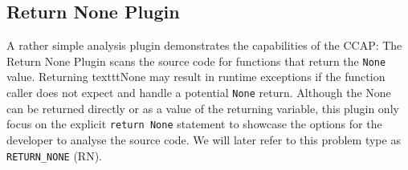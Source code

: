 \subsection{Return None Plugin}\label{sec:return_none_ccap_implementation}
A rather simple analysis plugin demonstrates the capabilities of the CCAP: The Return None Plugin scans the source code for functions that return the \texttt{None} value. Returning texttt{None} may result in runtime exceptions if the function caller does not expect and handle a potential \texttt{None} return. Although the None can be returned directly or as a value of the returning variable, this plugin only focus on the explicit \texttt{return None} statement to showcase the options for the developer to analyse the source code. We will later refer to this problem type as \texttt{RETURN\_NONE} (RN).

